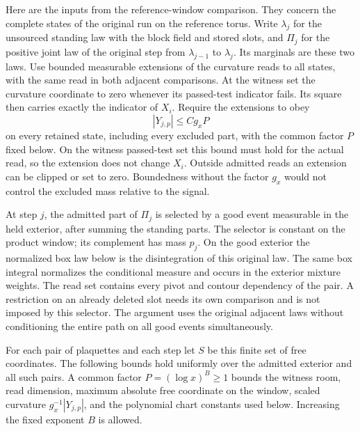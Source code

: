 \documentclass[11pt,letterpaper,reqno]{amsart}
\numberwithin{equation}{section}
\theoremstyle{definition}
\theoremstyle{remark}
\begin{document}
Here are the inputs from the reference-window comparison. They
concern the complete states of the original run on the reference
torus. Write \(\lambda_j\) for the unsourced standing law with
the block field and stored slots, and \(\Pi_j\) for the positive
joint law of the original step from \(\lambda_{j-1}\) to
\(\lambda_j\). Its marginals are these two laws.
Use bounded measurable extensions of the curvature reads to all
states, with the same read in both adjacent comparisons. At the
witness set the curvature coordinate to zero whenever its
passed-test indicator fails. Its square then carries exactly
the indicator of \(X_i\). Require the extensions to obey
\[
             |Y_{j,p}|\le C g_x P
\]
on every retained state, including every excluded part, with the
common factor \(P\) fixed below. On the witness passed-test set
this bound must hold for the actual read, so the extension does
not change \(X_i\). Outside admitted reads an extension can be
clipped or set to zero. Boundedness without the factor \(g_x\)
would not control the excluded mass relative to the signal.

At step \(j\), the admitted part of \(\Pi_j\) is selected by a
good event measurable in the held exterior, after summing the
standing parts. The selector is constant on the product window;
its complement has mass \(p_j\). On the good exterior the
normalized box law below is the disintegration of this original
law. The same box integral normalizes the conditional measure
and occurs in the exterior mixture weights. The read set
contains every pivot and contour dependency of the pair. A
restriction on an already deleted slot needs its own comparison
and is not imposed by this selector. The argument uses the
original adjacent laws without conditioning the entire path on
all good events simultaneously.

For each pair of plaquettes and each step let $S$ be this finite
set of free coordinates. The following bounds hold
uniformly over the admitted exterior and all such pairs. A common
factor $P=(\log x)^B\ge1$ bounds the witness room, read dimension,
maximum absolute free coordinate on the window, scaled curvature $g_x^{-1}|Y_{j,p}|$, and the
polynomial chart constants used below. Increasing the fixed
exponent $B$ is allowed.
\end{document}
